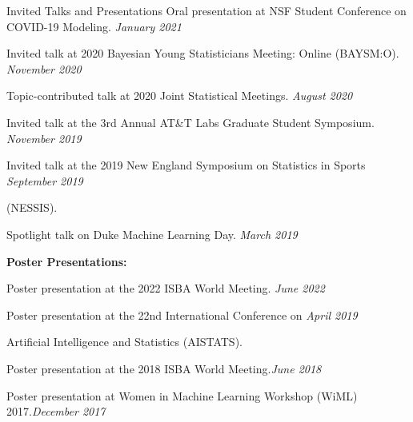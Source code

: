 \documentclass{resume} %
\begin{document}
\begin{rSection}{Invited Talks and Presentations}
	{Oral presentation at NSF Student Conference on COVID-19 Modeling.} \hfill {\em January 2021}
	
	{Invited talk at 2020 Bayesian Young Statisticians Meeting: Online (BAYSM:O).} \hfill {\em November 2020}
	
	{Topic-contributed talk at 2020 Joint Statistical Meetings. } \hfill {\em August 2020}
	
	{Invited talk at the 3rd Annual AT\&T Labs Graduate Student Symposium.} \hfill {\em November 2019}
	
	
	{Invited talk at the 2019 New England Symposium on Statistics in Sports} \hfill {\em September 2019}
	
	\vspace{-0.1in}
	(NESSIS).
	
	Spotlight talk on Duke Machine Learning Day. \hfill {\em March 2019}
	
	
	
	
	\medskip
	
	\hspace*{-0.2in}\textbf{Poster Presentations:}
	
	Poster presentation at the 2022 ISBA World Meeting. \hfill {\em June 2022}
	
	
	Poster presentation at the 22nd International Conference on   \hfill {\em April 2019}
	
	\vspace{-0.1in}
	Artificial Intelligence and Statistics (AISTATS).
	
	
	
	Poster presentation at the 2018 ISBA World Meeting.\hfill {\em June 2018}
	
	
	Poster presentation at Women in Machine Learning Workshop (WiML) 2017.\hfill {\em December 2017}
	
\end{rSection}
\end{document}
